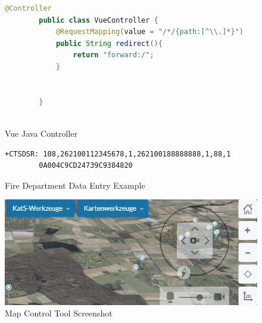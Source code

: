 \documentclass[11pt, titlepage, a4paper]{article}
\begin{document}
\begin{appendices}
\begin{figure}[H]
        \centering
    \end{figure}
    \begin{figure}[H]
        \caption{Vue Java Controller}
        \label{fig:vue}
        \begin{lstlisting}[language=java, frame=single]
        @Controller
        public class VueController {
            @RequestMapping(value = "/*/{path:[^\\.]*}")
            public String redirect(){
                return "forward:/";
            }
        
        
        }
        
        \end{lstlisting}
        \centering
    \end{figure}
    \begin{figure}[t]
        \caption{Fire Department Data Entry Example}
        \label{fig:pei}
        \begin{lstlisting}[frame=single]
        +CTSDSR: 108,262100112345678,1,262100188888888,1,88,1
        0A004C9CD24739C9384820
    \end{lstlisting}
        \centering
    \end{figure}

    \begin{figure}[H]
        \caption{Map Control Tool Screenshot}
        \label{fig:mapcontrol}
        \includegraphics[width=16cm]{dzgefahr_mapcontrol.png}
        \centering
    \end{figure}
\end{appendices}
\end{document}
